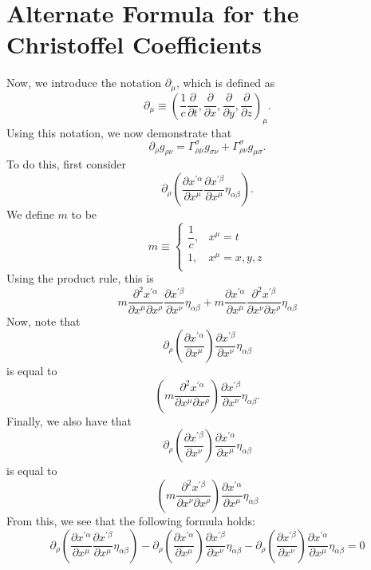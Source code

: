 \documentclass[12pt]{article}
\theoremstyle{definition}
\theoremstyle{remark}
\begin{document}
\section{Alternate Formula for the Christoffel Coefficients}
	Now, we introduce the notation $\partial_{\mu}$, which is defined as 
	\[
	\partial_{\mu} \equiv \left( \frac{1}{c} \frac{ \partial }{  \partial t } , \frac{ \partial }{ \partial x} , \frac{ \partial }{ \partial y }, \frac{ \partial }{ \partial z } \right)_{\mu} .
	\]
	Using this notation, we now demonstrate that 
	\[
	\partial_{\rho} g_{\rho \nu} = \Gamma^{ \sigma }_{ \rho \mu } g_{ \sigma \nu } + \Gamma^{ \sigma }_{ \rho \nu } g_{ \mu \sigma } .
	\]
	To do this, first consider 
	\[
	\partial_{\rho} 
	\left( \frac{ \partial x^{ \prime \alpha } }{ \partial x^{ \mu } } 
	\frac{ \partial x^{ \prime \beta } }{ \partial x^{ \mu } } 
	\eta_{ \alpha \beta } \right).
	\]
	We define $m$ to be 
	\[
	m \equiv 
	\begin{cases} 
	\dfrac{1}{c} ,& x^{\mu} = t \\
	1 ,& x^{\mu} = x,y,z \\
	\end{cases}
	\]
	Using the product rule, this is
	\[
	m \frac{ \partial^2 x^{ \prime \alpha } }{ \partial x^{ \mu } \partial x^{ \rho } } 
	\frac{ \partial x^{ \prime \beta } }{ \partial x^{ \nu } }
	\eta_{ \alpha \beta }
	+
	m \frac{ \partial x^{ \prime \alpha } }{ \partial x^{ \mu } } 
	\frac{ \partial^2 x^{ \prime \beta } }{ \partial x^{ \nu } \partial x^{ \rho } } \eta_{ \alpha \beta }
	\]
	Now, note that
	\[
	\partial_{ \rho } \left( \frac{ \partial x^{ \prime \alpha } }{ \partial x^{ \mu } } \right)
	\frac{ \partial x^{ \prime \beta } }{ \partial x^{ \nu } } \eta_{\alpha \beta } 
	\]
	is equal to
	\[
	\left( m \frac{ \partial^2 x^{ \prime \alpha } }{ \partial x^{ \mu } \partial x^{ \rho } } \right) \frac{ \partial x^{ \prime \beta } }{ \partial x^{ \nu } } \eta_{ \alpha \beta }.
	\]
	Finally, we also have that
	\[
	\partial_{ \rho } 
	\left( \frac{ \partial x^{ \prime \beta } }{ \partial x^{ \nu } }  \right)
	\frac{ \partial x^{ \prime \alpha } }{ \partial x^{ \mu } } \eta_{ \alpha \beta} 
	\]
	is equal to 
	\[
	\left( m \frac{ \partial^2 x^{ \prime \beta } }{ \partial x^{ \nu } \partial x^{ \rho } } \right) \frac{ \partial x^{ \prime \alpha } }{ \partial x^{ \mu } } \eta_{ \alpha \beta}
	\]
	From this, we see that the following formula holds:
	\[
	\partial_{\rho} 
	\left( \frac{ \partial x^{ \prime \alpha } }{ \partial x^{ \mu } } 
	\frac{ \partial x^{ \prime \beta } }{ \partial x^{ \mu } } 
	\eta_{ \alpha \beta } \right)
	-
	\partial_{ \rho }
	\left( \frac{ \partial x^{ \prime \alpha } }{ \partial x^{ \mu } } \right) 
	\frac{ \partial x^{ \prime \beta } }{ \partial x^{ \nu } } 
	\eta_{ \alpha \beta }
	-
	\partial_{ \rho } 
	\left( \frac{ \partial x^{ \prime \beta } }{ \partial x^{ \nu } } \right) 
	\frac{ \partial x^{ \prime \alpha } }{ \partial x^{ \mu } } \eta_{\alpha \beta } 
	=
	0
	\]
\end{document}
